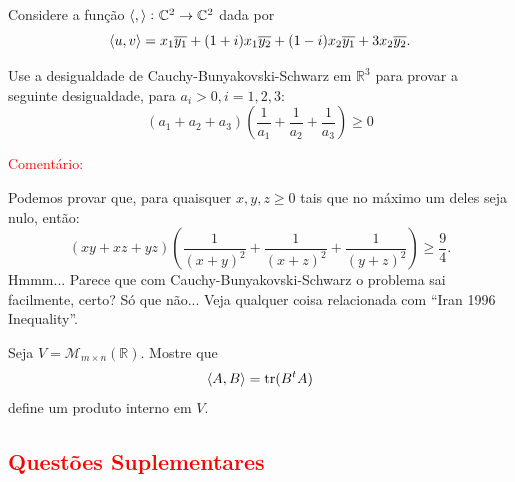 \documentclass[11pt,a4paper]{article}
\begin{document}
\begin{exercicio} Considere a função $\left\langle , \right\rangle \colon \mathbb{C}^2 \to \mathbb{C}^2$ dada por
\[
\left\langle u,v \right\rangle = x_1\overline{y_1} + (1+i)x_1\overline{y_2} + (1-i)x_2\overline{y_1} + 3x_2\overline{y_2}.
\]
\end{exercicio}
\solucao{}

\begin{exercicio} Use a desigualdade de Cauchy-Bunyakovski-Schwarz em $\mathbb{R}^3$ para provar a seguinte desigualdade, para $a_i > 0, i = 1,2,3:$
\[
(a_1 + a_2 + a_3) \left( \frac{1}{a_1} + \frac{1}{a_2} + \frac{1}{a_3} \right) \ge 0
\]
\end{exercicio}

\bigskip
\noindent
\textcolor{red}{Comentário:}

\medskip
\noindent
Podemos provar que, para quaisquer $x,y,z\geq 0$ tais que no máximo um deles seja nulo, então:
\[
\left(xy+xz+yz\right)\left(\frac{1}{(x+y)^2}+\frac{1}{(x+z)^2}+\frac{1}{(y+z)^2}\right)\geq\frac{9}{4}.
\]
Hmmm... Parece que com Cauchy-Bunyakovski-Schwarz o problema sai facilmente, certo? Só que não... Veja qualquer coisa relacionada com ``Iran 1996 Inequality''.

\begin{exercicio} Seja $V = \mathcal{M}_{m \times n}(\mathbb{R}).$ Mostre que \[\left\langle A,B \right\rangle = \mathrm{tr }(B^tA) \] define um produto interno em $V.$
\end{exercicio}
\solucao{}

\subsection*{\textcolor{red}{Questões Suplementares}}
\end{document}
